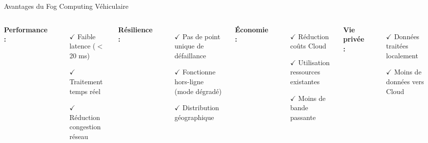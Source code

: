 ﻿\documentclass[aspectratio=169,11pt]{beamer}
\begin{document}
\begin{frame}{Avantages du Fog Computing V\'ehiculaire}
\begin{columns}
\textbf{Performance :}
\begin{itemize}
    \item[$\checkmark$] Faible latence ($<$ 20 ms)
    \item[$\checkmark$] Traitement temps r\'eel
    \item[$\checkmark$] R\'eduction congestion r\'eseau
\end{itemize}

\vspace{0.3cm}
\textbf{R\'esilience :}
\begin{itemize}
    \item[$\checkmark$] Pas de point unique de d\'efaillance
    \item[$\checkmark$] Fonctionne hors-ligne (mode d\'egrad\'e)
    \item[$\checkmark$] Distribution g\'eographique
\end{itemize}

\textbf{\'Economie :}
\begin{itemize}
    \item[$\checkmark$] R\'eduction co\^uts Cloud
    \item[$\checkmark$] Utilisation ressources existantes
    \item[$\checkmark$] Moins de bande passante
\end{itemize}

\vspace{0.3cm}
\textbf{Vie priv\'ee :}
\begin{itemize}
    \item[$\checkmark$] Donn\'ees trait\'ees localement
    \item[$\checkmark$] Moins de donn\'ees vers Cloud
\end{itemize}
\end{columns}
\end{frame}
\end{document}
